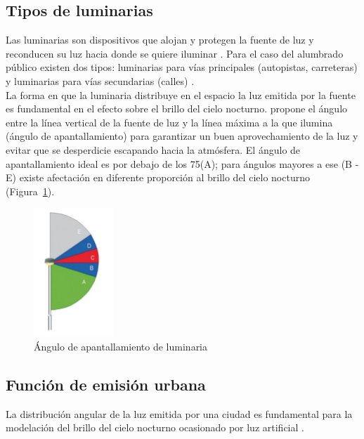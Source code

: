 \newpage

\subsection{Tipos de luminarias}

Las luminarias son dispositivos que alojan y protegen la fuente de luz y reconducen su luz hacia donde se quiere iluminar \citep{LibroCL}. Para el caso del alumbrado público existen dos tipos: luminarias para vías principales (autopistas, carreteras) y luminarias para vías secundarias (calles) \citep{INFO2019}.\\

La forma en que la luminaria distribuye en el espacio la luz emitida por la fuente es fundamental en el efecto sobre el brillo del cielo nocturno. \cite{Marin2009} propone el ángulo entre la línea vertical de la fuente de luz y la línea máxima a la que ilumina (ángulo de apantallamiento) para garantizar un buen aprovechamiento de la luz y evitar que se desperdicie escapando hacia la atmósfera. El ángulo de apantallamiento ideal es por debajo de los 75\grad (A); para ángulos mayores a ese (B - E) existe afectación en diferente proporción al brillo del cielo nocturno (Figura~\ref{anguloapantallamiento}).


\begin{figure}[htb]
  \centering
    \includegraphics[width=30mm, scale=0.3]{anguloapantallamiento}
  \caption{Ángulo de apantallamiento de luminaria \citep{Marin2009}}
  \label{anguloapantallamiento}
\end{figure}


\subsection{Función de emisión urbana}

La distribución angular de la luz emitida por una ciudad es fundamental para la modelación del brillo del cielo nocturno ocasionado por luz artificial \citep{Kocifaj2014}.\\

